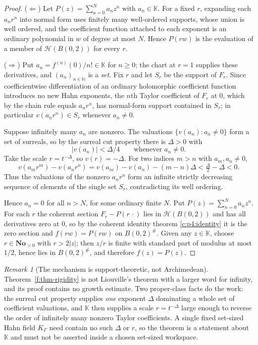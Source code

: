 \documentclass[11pt,a4paper]{article}
\numberwithin{equation}{section}
\theoremstyle{definition}
\theoremstyle{remark}
\newtheorem{remark}[theorem]{Remark}
\theoremstyle{plain}
\newcommand{\K}{\mathbb K}
\newcommand{\No}{\mathbf{No}}
\newcommand{\NN}{\mathbb N}
\newcommand{\halo}[1]{#1^{\#}}
\newcommand{\Hc}{\mathcal H}
\newcommand{\abs}[1]{\lvert #1\rvert}
\begin{document}
\begin{proof}
($\Leftarrow$)  Let $P(z)=\sum_{n=0}^{N}a_{n}z^{n}$ with $a_{n}\in\K$.
For a fixed $r$, expanding each $a_{n}r^{n}$ into normal form uses
finitely many well-ordered supports, whose union is well ordered, and
the coefficient function attached to each exponent is an ordinary
polynomial in $w$ of degree at most $N$.  Hence $P(rw)$ is the
evaluation of a member of $\Hc(B(0,2))$ for every $r$.

($\Rightarrow$)  Put $a_{n}=f^{(n)}(0)/n!\in\K$ for $n\ge0$; the chart
at $r=1$ supplies these derivatives, and $(a_{n})_{n\in\NN}$ is a
\emph{set}.  Fix $r$ and let $S_{r}$ be the support of $F_{r}$.  Since
coefficientwise differentiation of an ordinary holomorphic coefficient
function introduces no new Hahn exponents, the $n$th Taylor coefficient
of $F_{r}$ at $0$, which by the chain rule equals $a_{n}r^{n}$, has
normal-form support contained in $S_{r}$; in particular
$v(a_{n}r^{n})\in S_{r}$ whenever $a_{n}\ne0$.

Suppose infinitely many $a_{n}$ are nonzero.  The valuations
$\{v(a_{n}):a_{n}\ne0\}$ form a set of surreals, so by the surreal cut
property there is $\Delta>0$ with
\[
 \abs{v(a_{n})}<\Delta/4\qquad\text{whenever }a_{n}\ne0 .
\]
Take the scale $r=t^{-\Delta}$, so $v(r)=-\Delta$.  For two indices
$m>n$ with $a_{m},a_{n}\ne0$,
\[
 v(a_{m}r^{m})-v(a_{n}r^{n})
 =v(a_{m})-v(a_{n})-(m-n)\Delta
 <\tfrac{\Delta}{2}-\Delta<0 .
\]
Thus the valuations of the nonzero $a_{n}r^{n}$ form an infinite
strictly decreasing sequence of elements of the single set $S_{r}$,
contradicting its well ordering.

Hence $a_{n}=0$ for all $n>N$, for some ordinary finite $N$.  Put
$P(z)=\sum_{n=0}^{N}a_{n}z^{n}$.  For each $r$ the coherent section
$F_{r}-P(r\,\cdot)$ lies in $\Hc(B(0,2))$ and has all derivatives zero
at $0$, so by the coherent identity theorem \ref{c:p4:identity} it is
the zero section and $f(rw)=P(rw)$ on $\halo{B(0,2)}$.  Given any
$z\in\K$, choose $r\in\No_{>0}$ with $r>2\abs z$; then $z/r$ is finite
with standard part of modulus at most $1/2$, hence lies in
$\halo{B(0,2)}$, and therefore $f(z)=P(z)$.
\end{proof}

\begin{remark}[The mechanism is support-theoretic, not
Archimedean]\label{f:rem-rigiditymechanism}
Theorem~\ref{f:thm-rigidity} is not Liouville's theorem with a larger
word for infinity, and its proof contains no growth estimate.  Two
proper-class facts do the work: the surreal cut property supplies
\emph{one} exponent $\Delta$ dominating a whole set of coefficient
valuations, and $\K$ then supplies a scale $r=t^{-\Delta}$ large enough
to reverse the order of infinitely many nonzero Taylor coefficients.  A
single fixed set-sized Hahn field $K_{\Gamma}$ need contain no such
$\Delta$ or $r$, so the theorem is a statement about $\K$ and must not
be asserted inside a chosen set-sized workspace.
\end{remark}
\end{document}
